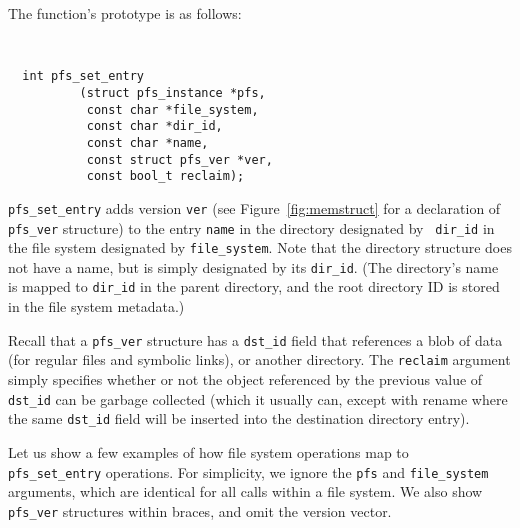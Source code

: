 The function's prototype is as follows:

\begin{center}
{\tt \small
\begin{verbatim}
  int pfs_set_entry 
          (struct pfs_instance *pfs,
           const char *file_system,
           const char *dir_id,
           const char *name,
           const struct pfs_ver *ver,
           const bool_t reclaim);
\end{verbatim}
}
\end{center}

{\tt pfs\_set\_entry} adds version {\tt ver} (see
Figure~\ref{fig:memstruct} for a declaration of {\tt pfs\_ver}
structure) to the entry {\tt name} in the directory designated by {\tt
  dir\_id} in the file system designated by {\tt file\_system}.  Note
that the directory structure does not have a name, but is simply
designated by its {\tt dir\_id}.  (The directory's name is mapped to
{\tt dir\_id} in the parent directory, and the root directory ID is
stored in the file system metadata.)

Recall that a \texttt{pfs\_ver} structure has a \texttt{dst\_id} field
that references a blob of data (for regular files and symbolic links),
or another directory.  The {\tt reclaim} argument simply specifies
whether or not the object referenced by the previous value of
\texttt{dst\_id} can be garbage collected (which it usually can,
except with rename where the same \texttt{dst\_id} field will be
inserted into the destination directory entry).

Let us show a few examples of how file system operations map to {\tt
pfs\_set\_entry} operations.  For simplicity, we ignore the {\tt pfs}
and {\tt file\_system} arguments, which are identical for all calls
within a file system.  We also show \texttt{pfs\_ver} structures
within braces, and omit the version vector.

